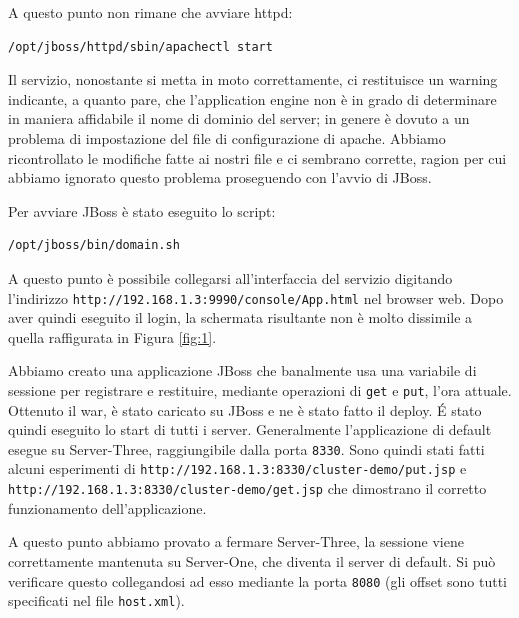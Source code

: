 \documentclass[twoside]{article}
\begin{document}
A questo punto non rimane che avviare httpd:
\begin{lstlisting}[frame=trBL]
/opt/jboss/httpd/sbin/apachectl start
\end{lstlisting}

Il servizio, nonostante si metta in moto correttamente, ci restituisce un warning indicante, a quanto pare,
che l'application engine non è in grado di determinare in maniera affidabile il nome di dominio del server;
in genere è dovuto a un problema di impostazione del file di configurazione di apache. Abbiamo ricontrollato
le modifiche fatte ai nostri file e ci sembrano corrette, ragion per cui abbiamo ignorato questo problema
proseguendo con l'avvio di JBoss.

Per avviare JBoss è stato eseguito lo script:
\begin{lstlisting}[frame=trBL]
/opt/jboss/bin/domain.sh
\end{lstlisting}

A questo punto è possibile collegarsi all'interfaccia del servizio digitando l'indirizzo
\texttt{http://192.168.1.3:9990/console/App.html} nel browser web. Dopo aver quindi eseguito il login, la
schermata risultante non è molto dissimile a quella raffigurata in Figura \ref{fig:1}.

Abbiamo creato una applicazione JBoss che banalmente usa una variabile di sessione per registrare
e restituire, mediante operazioni di \texttt{get} e \texttt{put}, l'ora attuale. Ottenuto il war,
è stato caricato su JBoss e ne è stato fatto il deploy. \'{E} stato quindi eseguito lo start di
tutti i server. Generalmente l'applicazione di default esegue su Server-Three, raggiungibile dalla
porta \texttt{8330}. Sono quindi stati fatti alcuni esperimenti di 
\texttt{http://192.168.1.3:8330/cluster-demo/put.jsp} e 
\texttt{http://192.168.1.3:8330/cluster-demo/get.jsp} che dimostrano il corretto funzionamento
dell'applicazione.

A questo punto abbiamo provato a fermare Server-Three, la sessione viene correttamente mantenuta
su Server-One, che diventa il server di default. Si può verificare questo collegandosi ad esso
mediante la porta \texttt{8080} (gli offset sono tutti specificati nel file \texttt{host.xml}).

\printbibliography
\end{document}
